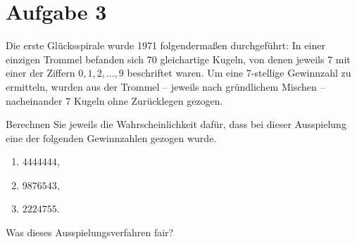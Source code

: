 \documentclass{exercise}
\begin{document}
    \section*{Aufgabe 3}

    \begin{problem}
        Die erste Glücksspirale wurde 1971 folgendermaßen durchgeführt: In einer einzigen Trommel befanden sich 70 gleichartige Kugeln, von denen jeweils 7 mit einer der Ziffern \(0, 1, 2, \ldots, 9\) beschriftet waren.
        Um eine 7-stellige Gewinnzahl zu ermitteln, wurden aus der Trommel -- jeweils nach gründlichem Mischen -- nacheinander 7 Kugeln ohne Zurücklegen gezogen.
        
        Berechnen Sie jeweils die Wahrscheinlichkeit dafür, dass bei dieser Ausspielung eine der folgenden Gewinnzahlen gezogen wurde.
        \begin{enumerate}
            \item \(4444444\),
            \item \(9876543\),
            \item \(2224755\).
        \end{enumerate}
        Was dieses Ausspielungsverfahren fair?
    \end{problem}
\end{document}
